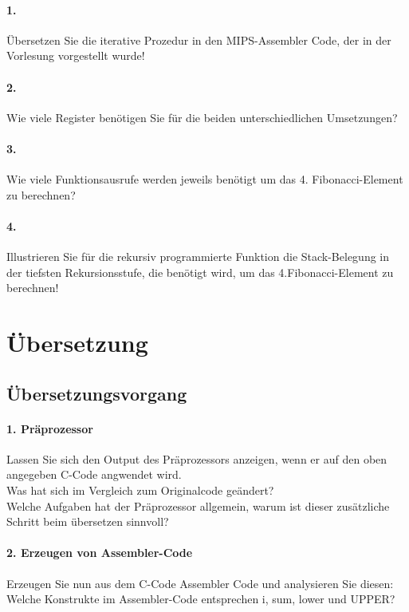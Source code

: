 \documentclass[paper=a4, fontsize=11pt]{scrartcl}
\numberwithin{equation}{section}
\numberwithin{figure}{section}
\numberwithin{table}{section}
\begin{document}
\paragraph{1.}
Übersetzen Sie die iterative Prozedur in den MIPS-Assembler Code, der in der Vorlesung vorgestellt wurde!

\paragraph{2.}
Wie viele Register benötigen Sie für die beiden unterschiedlichen Umsetzungen?

\paragraph{3.}
Wie viele Funktionsausrufe werden jeweils benötigt um das 4. Fibonacci-Element zu berechnen?

\paragraph{4.}
Illustrieren Sie für die rekursiv programmierte Funktion die Stack-Belegung in der tiefsten Rekursionsstufe, die benötigt wird, um das 4.Fibonacci-Element zu berechnen!

\section{Übersetzung}
\subsection{Übersetzungsvorgang}

\paragraph{1. Präprozessor}
Lassen Sie sich den Output des Präprozessors anzeigen, wenn er auf den oben angegeben C-Code angwendet wird. \\
Was hat sich im Vergleich zum Originalcode geändert? \\
Welche Aufgaben hat der Präprozessor allgemein, warum ist dieser zusätzliche Schritt beim übersetzen sinnvoll?

\paragraph{2. Erzeugen von Assembler-Code}
Erzeugen Sie nun aus dem C-Code Assembler Code und analysieren Sie diesen: Welche Konstrukte im Assembler-Code entsprechen i, sum, lower und UPPER?
\end{document}
